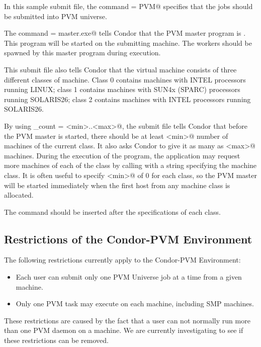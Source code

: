 In this sample submit file, the command \verb@universe = PVM@
specifies that the jobs should be submitted into PVM universe.

The command \verb@executable = master.exe@ tells Condor that the PVM
master program is .  This program will be started on
the submitting machine.  The workers should be spawned by this master
program during execution.

This submit file also tells Condor that the virtual machine
consists of three different classes of machine.  Class
0 contains machines with INTEL processors running LINUX; class
1 contains machines with SUN4x (SPARC) processors running SOLARIS26;
class 2 contains machines with INTEL processors running SOLARIS26.

By using \verb@machine_count = <min>..<max>@, the submit file tells
Condor that before the PVM master is started, there should be at least
\verb@<min>@ 
number of machines of the current class.  It also asks Condor to give
it as many as \verb@<max>@ machines.  During the execution of the program,
the application may request more machines of each of the class by calling
 with a string specifying the machine
class.
It is often useful to specify \verb@<min>@ of 0 for each
class, so the PVM master will be started immediately when the first
host from any machine class is allocated.

The  command should be inserted after the specifications of
each class.

\subsection{Restrictions of the Condor-PVM Environment}

The following restrictions currently apply to the Condor-PVM
Environment:

\begin{itemize}

\item Each user can submit only one PVM Universe job at a time from a
given machine.

\item Only one PVM task may execute on each machine, including SMP
machines.

\end{itemize}

These restrictions are caused by the fact that a user can not normally
run more than one PVM daemon on a machine.  We are currently
investigating to see if these restrictions can be removed.

